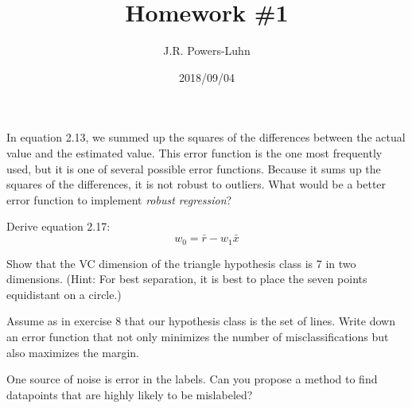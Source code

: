 \documentclass{hw}
\author{J.R. Powers-Luhn}
\date{2018/09/04}
\title{Homework \#1}
\newcommand{\mean}{\bar}
\begin{document}

    In equation 2.13, we summed up the squares of the differences between the actual value and the estimated value. This error function is the one most frequently used, but it is one of several possible error functions. Because it sums up the squares of the differences, it is not robust to outliers. What would be a better error function to implement \textit{robust regression}?

\solution
    

    Derive equation 2.17: $$ w_0 = \mean{r} - w_1 \mean{x} $$

\solution
    

    Show that the VC dimension of the triangle hypothesis class is 7 in two dimensions.  (Hint: For best separation, it is best to place the seven points equidistant on a circle.)

\solution
    

    Assume as in exercise 8 that our hypothesis class is the set of lines. Write down an error function that not only minimizes the number of misclassifications but also maximizes the margin.

\solution
    

    One source of noise is error in the labels. Can you propose a method to find datapoints that are highly likely to be mislabeled?

\solution
    
\end{document}
